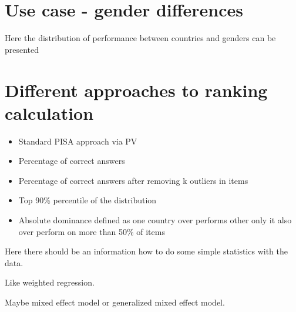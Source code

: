 \section{Use case - gender differences}

Here the distribution of performance between countries and genders can be presented



\section{Different approaches to ranking calculation}

\begin{itemize}
\item Standard PISA approach via PV
\item Percentage of correct answers
\item Percentage of correct answers after removing k outliers in items
\item Top 90\% percentile of the distribution
\item Absolute dominance defined as one country over performs other only it also over perform on more than 50\% of items
\end{itemize}








Here there should be an information how to do some simple statistics with the data.

Like weighted regression.

Maybe mixed effect model or generalized mixed effect model.

